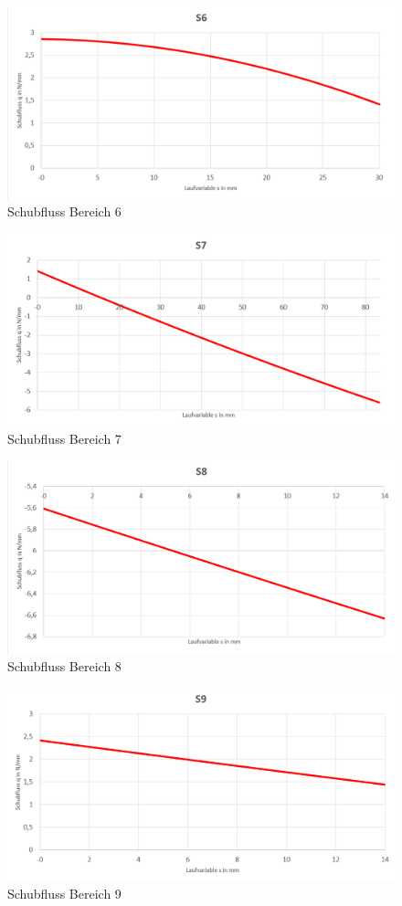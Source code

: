 \begin{figure}
	\includegraphics[width=1.0\textwidth]{Bilder/S6.png}
	\caption{Schubfluss Bereich 6}
\end{figure}
\begin{figure}
	\includegraphics[width=1.0\textwidth]{Bilder/S7.png}
	\caption{Schubfluss Bereich 7}
\end{figure}
\begin{figure}
	\includegraphics[width=1.0\textwidth]{Bilder/S8.png}
	\caption{Schubfluss Bereich 8}
\end{figure}
\begin{figure}
	\includegraphics[width=1.0\textwidth]{Bilder/S9.png}
	\caption{Schubfluss Bereich 9}
\end{figure}
